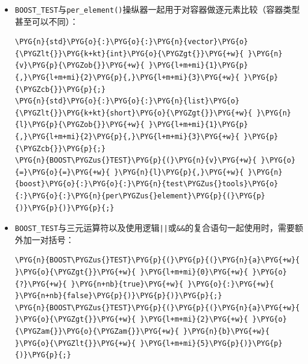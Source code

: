 \begin{itemize}

\item \texttt{BOOST\_\allowbreak{}TEST}与\texttt{per\_\allowbreak{}element()}操纵器一起用于对容器做逐元素比较（容器类型甚至可以不同）：



\begin{codeblockbg}
\begin{Verbatim}[commandchars=\\\{\},breaklines=true,breakanywhere=true,fontsize=\codefont,xleftmargin=17bp]
\PYG{n}{std}\PYG{o}{:}\PYG{o}{:}\PYG{n}{vector}\PYG{o}{\PYGZlt{}}\PYG{k+kt}{int}\PYG{o}{\PYGZgt{}}\PYG{+w}{ }\PYG{n}{v}\PYG{p}{\PYGZob{}}\PYG{+w}{ }\PYG{l+m+mi}{1}\PYG{p}{,}\PYG{l+m+mi}{2}\PYG{p}{,}\PYG{l+m+mi}{3}\PYG{+w}{ }\PYG{p}{\PYGZcb{}}\PYG{p}{;}
\PYG{n}{std}\PYG{o}{:}\PYG{o}{:}\PYG{n}{list}\PYG{o}{\PYGZlt{}}\PYG{k+kt}{short}\PYG{o}{\PYGZgt{}}\PYG{+w}{ }\PYG{n}{l}\PYG{p}{\PYGZob{}}\PYG{+w}{ }\PYG{l+m+mi}{1}\PYG{p}{,}\PYG{l+m+mi}{2}\PYG{p}{,}\PYG{l+m+mi}{3}\PYG{+w}{ }\PYG{p}{\PYGZcb{}}\PYG{p}{;}
\PYG{n}{BOOST\PYGZus{}TEST}\PYG{p}{(}\PYG{n}{v}\PYG{+w}{ }\PYG{o}{=}\PYG{o}{=}\PYG{+w}{ }\PYG{n}{l}\PYG{p}{,}\PYG{+w}{ }\PYG{n}{boost}\PYG{o}{:}\PYG{o}{:}\PYG{n}{test\PYGZus{}tools}\PYG{o}{:}\PYG{o}{:}\PYG{n}{per\PYGZus{}element}\PYG{p}{(}\PYG{p}{)}\PYG{p}{)}\PYG{p}{;}
\end{Verbatim}
\end{codeblockbg}



\item \texttt{BOOST\_\allowbreak{}TEST}与三元运算符以及使用逻辑\texttt{||}或\texttt{\&\&}的复合语句一起使用时，需要额外加一对括号：



\begin{codeblockbg}
\begin{Verbatim}[commandchars=\\\{\},breaklines=true,breakanywhere=true,fontsize=\codefont,xleftmargin=17bp]
\PYG{n}{BOOST\PYGZus{}TEST}\PYG{p}{(}\PYG{p}{(}\PYG{n}{a}\PYG{+w}{ }\PYG{o}{\PYGZgt{}}\PYG{+w}{ }\PYG{l+m+mi}{0}\PYG{+w}{ }\PYG{o}{?}\PYG{+w}{ }\PYG{n+nb}{true}\PYG{+w}{ }\PYG{o}{:}\PYG{+w}{ }\PYG{n+nb}{false}\PYG{p}{)}\PYG{p}{)}\PYG{p}{;}
\PYG{n}{BOOST\PYGZus{}TEST}\PYG{p}{(}\PYG{p}{(}\PYG{n}{a}\PYG{+w}{ }\PYG{o}{\PYGZgt{}}\PYG{+w}{ }\PYG{l+m+mi}{2}\PYG{+w}{ }\PYG{o}{\PYGZam{}}\PYG{o}{\PYGZam{}}\PYG{+w}{ }\PYG{n}{b}\PYG{+w}{ }\PYG{o}{\PYGZlt{}}\PYG{+w}{ }\PYG{l+m+mi}{5}\PYG{p}{)}\PYG{p}{)}\PYG{p}{;}
\end{Verbatim}
\end{codeblockbg}



\end{itemize}
